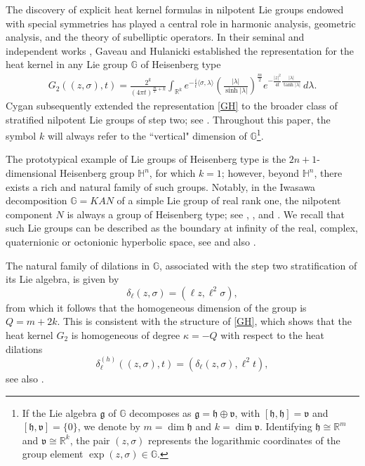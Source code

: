 \documentclass[11pt,a4paper]{amsart}
\def \R {\mathbb{R}}
\newcommand{\Hn}{\mathbb H^n}
\newcommand{\bG}{\mathbb {G}}
\newcommand{\bg}{\mathfrak g}
\numberwithin{equation}{section}
\numberwithin{equation}{section}
\begin{document}
The discovery of explicit heat kernel formulas in nilpotent Lie groups endowed with special symmetries has played a central role in harmonic analysis, geometric analysis, and the theory of subelliptic operators. In their seminal and independent works \cite{Gav, Hu}, Gaveau and Hulanicki established the representation for the heat kernel in any Lie group \(\bG\) of Heisenberg type
\begin{align}\label{GH}
G_2((z,\sigma),t)
   = \frac{2^k}{(4\pi t)^{\frac m2+k}}
     \int_{\R^k} e^{-\frac{i}{t}\langle\sigma,\lambda\rangle}
     \left(\frac{|\lambda|}{\sinh |\lambda|}\right)^{\frac m2}
     e^{- \frac{|z|^2}{4t}\frac{|\lambda|}{\tanh |\lambda|}}
     \, d\lambda.
\end{align}
Cygan subsequently extended the representation \eqref{GH} to the broader class of stratified nilpotent Lie groups of step two; see \cite{Cy}. Throughout this paper, the symbol \(k\) will always refer to the ``vertical" dimension of $\bG$\footnote{If the Lie algebra \(\bg\) of \(\bG\) decomposes as \(\bg = \mathfrak h \oplus \mathfrak v\), with \([\mathfrak h, \mathfrak h] = \mathfrak v\) and \([\mathfrak h,\mathfrak v] = \{0\}\), we denote by \(m=\dim \mathfrak h\) and \(k=\dim \mathfrak v\). Identifying \(\mathfrak h \cong \R^m\) and \(\mathfrak v\cong \R^k\), the pair \((z,\sigma)\) represents the logarithmic coordinates of the group element \(\exp(z,\sigma)\in \bG\).}.


The prototypical example of Lie groups of Heisenberg type is the $2n+1$-dimensional Heisenberg group \(\Hn\), for which $k=1$; however, beyond \(\Hn\), there exists a rich and natural family of such groups. Notably, in the Iwasawa decomposition $\bG = K A N$ of a simple Lie group of real rank one, the nilpotent component $N$ is always a group of Heisenberg type; see \cite{Ka2}, \cite{Adam85}, and \cite{CDKR}. We recall that such Lie groups can be described as the boundary at infinity of the  real, complex, quaternionic or octonionic hyperbolic space, see \cite[Sec. 9.3]{Mo} and also \cite[Sec. 10]{Pansu89}.

The natural family of dilations in \(\bG\), associated with the step two stratification of its Lie algebra, is given by
\[
\delta_\ell(z,\sigma)=(\ell z,\ell^2\sigma),
\]
from which it follows that the homogeneous dimension of the group is \(Q=m+2k\). This is consistent with the structure of \eqref{GH}, which shows that the heat kernel \(G_2\) is homogeneous of degree \(\kappa=-Q\) with respect to the heat dilations
\[
\delta^{(h)}_\ell((z,\sigma),t)=(\delta_\ell(z,\sigma),\ell^2 t),
\]
see also \cite[(3.2) in Theor. 3.1]{Fo75}.
 
\end{document}
